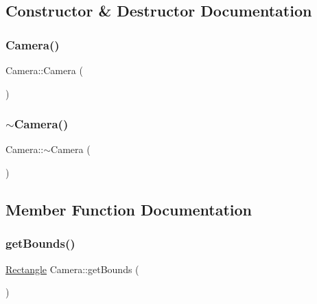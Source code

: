 \subsection{Constructor \& Destructor Documentation}
\mbox{\label{class_camera_a01f94c3543f56ede7af49dc778f19331}} 
\subsubsection{\texorpdfstring{Camera()}{Camera()}}
{\footnotesize\ttfamily Camera\+::\+Camera (\begin{DoxyParamCaption}{ }\end{DoxyParamCaption})}

\mbox{\label{class_camera_ad1897942d0ccf91052386388a497349f}} 
\subsubsection{\texorpdfstring{$\sim$\+Camera()}{~Camera()}}
{\footnotesize\ttfamily Camera\+::$\sim$\+Camera (\begin{DoxyParamCaption}{ }\end{DoxyParamCaption})}



\subsection{Member Function Documentation}
\mbox{\label{class_camera_af17699acfd4d8fecc450a64e619f95d5}} 
\subsubsection{\texorpdfstring{get\+Bounds()}{getBounds()}}
{\footnotesize\ttfamily \hyperlink{class_rectangle}{Rectangle} Camera\+::get\+Bounds (\begin{DoxyParamCaption}{ }\end{DoxyParamCaption})\hspace{0.3cm}{\ttfamily [inline]}}

\mbox{\label{class_camera_a6aa244c08427100da9e8ea5b2fa88cd8}} 
